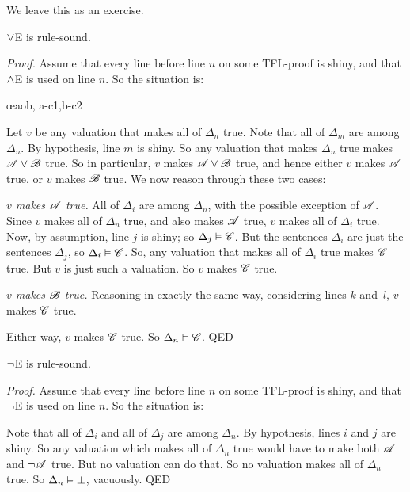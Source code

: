 We leave this as an exercise.

\begin{factoidboxe}$\vee$E is rule-sound.
\end{factoidboxe}

\emph{Proof.}
	Assume that every line before line $n$ on some TFL-proof is shiny, and that $\wedge$E is used on line $n$. So the situation is:
   \begin{fitchproof}
	   \open
		   \AS %
	   \close
	   \open
		   \AS %
	   \close
	   \oe{aob, a-c1,b-c2}
   \end{fitchproof}\noindent
Let $v$ be any valuation that makes all of $\Delta_{n}$ true. Note that all of $\Delta_m$ are among $\Delta_{n}$. By hypothesis, line $m$ is shiny. So any valuation that makes $\Delta_{n}$ true makes $\mathscr{A} \vee \mathscr{B}$ true. So in particular, $v$ makes $\mathscr{A} \vee \mathscr{B}$ true, and hence either $v$ makes $\mathscr{A}$ true, or $v$ makes $\mathscr{B}$ true. We now reason through these two cases:
   \begin{numberlist}
	   \item \emph{$v$ makes $\mathscr{A}$ true.} All of $\Delta_i$ are among $\Delta_{n}$, with the possible exception of $\mathscr{A}$. Since $v$ makes all of $\Delta_{n}$ true, and also makes $\mathscr{A}$ true,  $v$ makes all of $\Delta_i$ true. Now, by assumption, line $j$ is shiny; so $\Delta_{j} \vDash \mathscr{C}$. But the sentences $\Delta_i$ are just the sentences $\Delta_{j}$, so $\Delta_i \vDash \mathscr{C}$. So, any valuation that makes all of $\Delta_i$ true makes $\mathscr{C}$ true. But $v$ is just such a valuation. So $v$ makes $\mathscr{C}$ true.
	   \item \emph{$v$ makes $\mathscr{B}$ true.} Reasoning in exactly the same way, considering lines $k$ and~$l$, $v$ makes $\mathscr{C}$ true.
	   \end{numberlist}
Either way, $v$ makes $\mathscr{C}$ true. So $\Delta_n \vDash \mathscr{C}$.
QED


\begin{factoidboxe}
	$\neg$E is rule-sound.
\end{factoidboxe}

\emph{Proof.}
	Assume that every line before line $n$ on some TFL-proof is shiny, and that $\neg$E is used on line $n$. So the situation is:
\begin{fitchproof}
\end{fitchproof}\noindent
Note that all of $\Delta_i$ and all of $\Delta_j$ are among $\Delta_{n}$. By hypothesis, lines $i$ and $j$ are shiny. So any valuation which makes all of $\Delta_{n}$ true would have to make both $\mathscr{A}$ and $\neg\mathscr{A}$ true. But no valuation can do that. So no valuation makes all of $\Delta_{n}$ true. So $\Delta_{n} \vDash \bot$, vacuously.
QED


